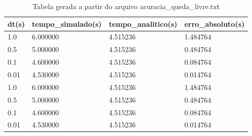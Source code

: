\begin{table}
\caption{Tabela gerada a partir do arquivo acuracia_queda_livre.txt}
\label{tab:acuracia_queda_livre}
\begin{tabular}{llll}
\toprule
dt(s) & tempo_simulado(s) & tempo_analitico(s) & erro_absoluto(s) \\
\midrule
1.0 & 6.000000 & 4.515236 & 1.484764 \\
0.5 & 5.000000 & 4.515236 & 0.484764 \\
0.1 & 4.600000 & 4.515236 & 0.084764 \\
0.01 & 4.530000 & 4.515236 & 0.014764 \\
1.0 & 6.000000 & 4.515236 & 1.484764 \\
0.5 & 5.000000 & 4.515236 & 0.484764 \\
0.1 & 4.600000 & 4.515236 & 0.084764 \\
0.01 & 4.530000 & 4.515236 & 0.014764 \\
\bottomrule
\end{tabular}
\end{table}
